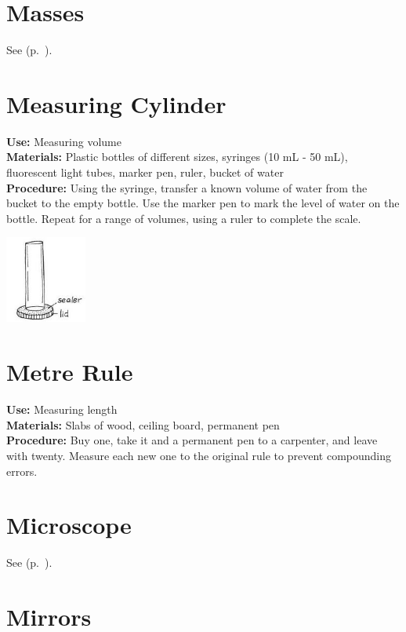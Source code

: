 \begin{multicols}{2}
\section{Masses}
\label{sec:masses}
See  (p.~\pageref{sec:weights}).

\section{Measuring Cylinder}
\label{sec:meascyl}
\vspace{-10pt}
\textbf{Use:} Measuring volume\\
\textbf{Materials:} Plastic bottles of different sizes, syringes (10 mL - 50 mL), fluorescent light tubes, marker pen, ruler, bucket of water\\
\textbf{Procedure:} Using the syringe, transfer a known volume of water from the bucket to the empty bottle. Use the marker pen to mark the level of water on the bottle. Repeat for a range of volumes, using a ruler to complete the scale. 
\begin{center}
\includegraphics[width=0.2\textwidth]{./img/vso/meas-cyl.jpg}
\end{center}

\section{Metre Rule}
\label{sec:meter-rule}
\vspace{-10pt}
\textbf{Use:} Measuring length\\
\textbf{Materials:} Slabs of wood, ceiling board, permanent pen\\
\textbf{Procedure:} Buy one, take it and a permanent pen to a carpenter, and leave with twenty. Measure each new one to the original rule to prevent compounding errors.

\section{Microscope}
\label{sec:microscope}
See  (p.~\pageref{cha:microscopy}).

\section{Mirrors}
\label{sec:mirrors}


\end{multicols}
